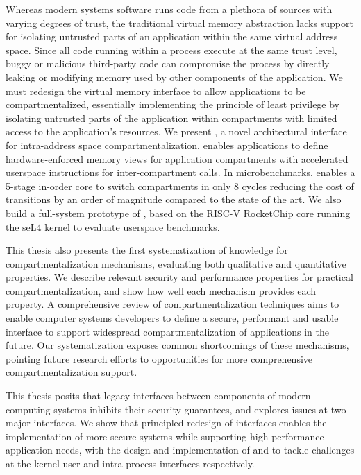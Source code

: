 Whereas modern systems software runs code from a plethora of sources with
varying degrees of trust, the traditional virtual memory abstraction lacks
support for isolating untrusted parts of an application within the same 
virtual address space.
Since all code running within a process execute at the same trust level,
buggy or malicious third-party code can compromise
the process by directly leaking or modifying memory used by other components 
of the application.
We must redesign the virtual memory interface to allow applications to
be compartmentalized, essentially implementing the principle of least privilege
by isolating untrusted parts of the application within compartments with 
limited access to the application's resources.
We present \seccells, a novel architectural interface for intra-address space
compartmentalization.
\seccells enables applications to define hardware-enforced memory views for 
application compartments with 
accelerated userspace instructions for inter-compartment calls.
In microbenchmarks, \seccells enables a 5-stage in-order core to switch 
compartments in only 8 cycles reducing the cost of transitions by an order
of magnitude compared to the state of the art.
We also build a full-system prototype of \seccells, based on the RISC-V 
RocketChip core running the seL4 kernel to evaluate userspace benchmarks.

This thesis also presents the first systematization of knowledge for  
compartmentalization mechanisms, evaluating both qualitative and quantitative
properties.
We describe relevant security and performance properties for practical
compartmentalization, and show how well each mechanism provides each
property.
A comprehensive review of compartmentalization techniques aims to enable
computer systems developers to define a secure, performant and usable interface
to support widespread compartmentalization of applications in the future.
Our systematization exposes common shortcomings of these mechanisms,
pointing future research efforts to opportunities for more comprehensive
compartmentalization support.

This thesis posits that legacy interfaces between components of modern
computing systems inhibits their security guarantees, and explores issues
at two major interfaces.
We show that principled redesign of interfaces enables the implementation of
more secure systems while supporting high-performance application needs,
with the design and implementation of \midas and \seccells to tackle challenges
at the kernel-user and intra-process interfaces respectively.

